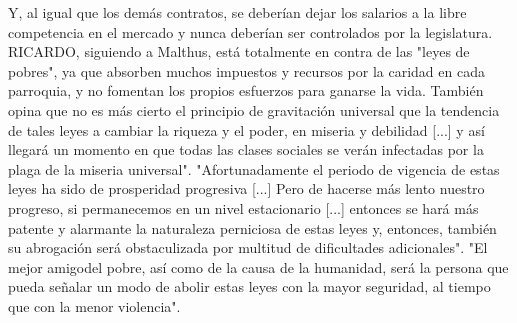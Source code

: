 \documentclass[10pt,a4paper]{article}
\begin{document}
Y, al igual que los demás contratos, se deberían dejar los salarios a la libre competencia en el mercado y nunca deberían ser controlados por la legislatura. RICARDO, siguiendo a Malthus, está totalmente en contra de las "leyes de pobres", ya que absorben muchos impuestos y recursos por la caridad en cada parroquia, y no fomentan los propios esfuerzos para ganarse la vida. También opina que no es más cierto el principio de gravitación universal que la tendencia de tales leyes a cambiar la riqueza y el poder, en miseria y debilidad [...] y así llegará un momento en que todas las clases sociales se verán infectadas por la plaga de la miseria universal". "Afortunadamente el periodo de vigencia de estas leyes ha sido de prosperidad progresiva [...] Pero de hacerse más lento nuestro progreso, si permanecemos en un nivel estacionario [...] entonces se hará más patente y alarmante la naturaleza perniciosa de estas leyes y, entonces, también su abrogación será obstaculizada por multitud de dificultades adicionales". "El mejor amigodel pobre, así como de la causa de la humanidad, será la persona que pueda señalar un modo de abolir estas leyes con la mayor seguridad, al tiempo que con la menor violencia".
\end{document}
